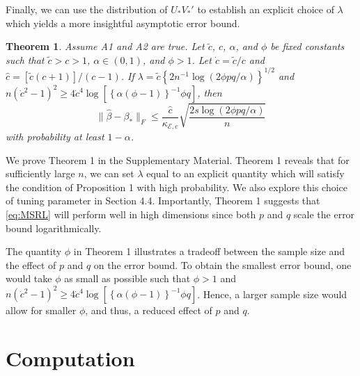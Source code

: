 \documentclass[12pt]{article}
\newtheorem{theorem}{Theorem}
\begin{document}
Finally, we can use the distribution of $U_*V_*'$ to establish an explicit choice of $\lambda$ which yields a more insightful asymptotic error bound. 
\begin{theorem}\label{thm:asymp}
Assume A1 and A2 are true. Let $\tilde{c}$, $c$, $\alpha$, and $\phi$ be fixed constants such that $\tilde{c} > c > 1$, $\alpha \in (0,1)$, and $\phi > 1$. Let $\dot{c} = \tilde{c}/c$ and $\hat{c} = \left[\tilde{c}(c+1)\right]/(c-1)$. If $\lambda = \tilde{c} \left\{ 2 n^{-1} \log(2 \phi pq/\alpha)\right\}^{1/2}$ and $n (\dot{c}^2 - 1)^2 \geq 4 \dot{c}^4 \log [ \left\{ \alpha (\phi - 1)\right\}^{-1} \phi q ]$, then
$$\|\hat{\beta} - \beta_*\|_F \leq \frac{\hat{c}}{\kappa_{\mathcal{E},c}} \sqrt{\frac{2s \log(2 \phi pq/\alpha)}{n}}$$ with probability at least $1 - \alpha$. 
\end{theorem}
We prove Theorem 1 in the Supplementary Material. Theorem 1 reveals that for sufficiently large $n$, we can set $\lambda$ equal to an explicit quantity which will satisfy the condition of Proposition 1 with high probability.  We also explore this choice of tuning parameter in Section 4.4. Importantly, Theorem 1 suggests that \eqref{eq:MSRL} will perform well in high dimensions since both $p$ and $q$ scale the error bound logarithmically.

The quantity $\phi$ in Theorem 1 illustrates a tradeoff between the sample size and the effect of $p$ and $q$ on the error bound. To obtain the smallest error bound, one would take $\phi$ as small as possible such that $\phi > 1$ and $n (\dot{c}^2 - 1)^2 \geq 4 \dot{c}^4 \log [ \left\{  \alpha (\phi - 1)\right\}^{-1}\phi q ]$. Hence, a larger sample size would allow for smaller $\phi$, and thus, a reduced effect of $p$ and $q$. 

\section{Computation}
\end{document}
